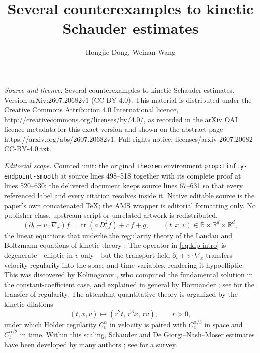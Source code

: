 \documentclass[10pt,a4paper]{amsart}
\numberwithin{equation}{section}
\DeclareMathOperator{\tr}{tr}
\newcommand{\R}{\mathbb{R}}
\begin{document}
\title[Several counterexamples to kinetic Schauder estimates]{Several counterexamples to kinetic Schauder estimates}
\author{Hongjie Dong, Weinan Wang}
\date{}
\maketitle
\noindent\emph{Source and licence.} Several counterexamples to kinetic Schauder estimates. Version arXiv:2607.20682v1 (CC BY 4.0). This material is distributed under the Creative Commons Attribution 4.0 International licence, http://creativecommons.org/licenses/by/4.0/, as recorded in the arXiv OAI licence metadata for this exact version and shown on the abstract page https://arxiv.org/abs/2607.20682v1. Full rights notice: licenses/arxiv-2607.20682-CC-BY-4.0.txt.\par\smallskip
\noindent\textit{Editorial scope.} Counted unit: the original \texttt{theorem} environment \texttt{prop:Linfty-endpoint-smooth} at source lines 498--518 together with its complete proof at lines 520--630; the delivered document keeps source lines 67--631 so that every referenced label and every citation resolves inside it. Native editable source is the paper's own concatenated TeX; the AMS wrapper is editorial formatting only. No publisher class, upstream script or unrelated artwork is redistributed.
\begin{equation}\label{eq:kfp-intro}
   (\partial_t+v\cdot\nabla_x)f=\tr\!\left(a\,D_v^2 f\right)+c\,f+g,
   \qquad (t,x,v)\in\R\times\R^d\times\R^d,
\end{equation}
the linear equations that underlie the regularity theory of the Landau and Boltzmann equations of kinetic theory \cite{Villani02}.  The operator in \eqref{eq:kfp-intro} is degenerate---elliptic in $v$ only---but the transport field $\partial_t+v\cdot\nabla_x$ transfers velocity regularity into the space and time variables, rendering it hypoelliptic.  This was discovered by Kolmogorov \cite{Kolmogorov}, who computed the fundamental solution in the constant-coefficient case, and explained in general by H\"ormander \cite{Hormander}; see \cite{Bouchut} for the transfer of regularity.  The attendant quantitative theory is organized by the kinetic dilations
\[
(t,x,v)\mapsto(r^2t,\,r^3x,\,rv),\qquad r>0,
\]
under which H\"older regularity $C_v^\alpha$ in velocity is paired with $C_x^{\alpha/3}$ in space and $C_t^{\alpha/2}$ in time.  Within this scaling, Schauder and De Giorgi--Nash--Moser estimates have been developed by many authors \cite{GIMV,ImbertMouhot,ImbertSilvestreSchauder,BramantiBrandolini,DiFrancescoPolidoro,Manfredini,HaoWuZhang,Zhu}; see \cite{SilvestreOpen} for a survey.
\end{document}
